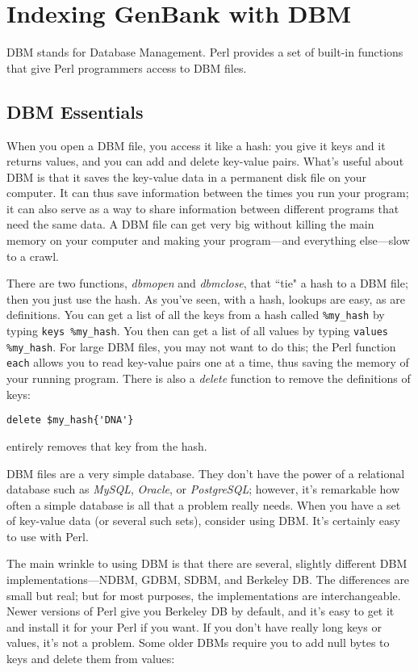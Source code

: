 \section{Indexing GenBank with DBM}
DBM stands for Database Management. Perl provides a set of built-in functions that give Perl programmers access to DBM files.

\subsection{DBM Essentials}
When you open a DBM file, you access it like a hash: you give it keys and it returns values, and you can add and delete key-value pairs. What's useful about DBM is that it saves the key-value data in a permanent disk file on your computer. It can thus save information between the times you run your program; it can also serve as a way to share information between different programs that need the same data. A DBM file can get very big without killing the main memory on your computer and making your program—and everything else—slow to a crawl.

There are two functions, \textit{dbmopen} and \textit{dbmclose}, that ``tie" a hash to a DBM file; then you just use the hash. As you've seen, with a hash, lookups are easy, as are definitions. You can get a list of all the keys from a hash called \verb|%my_hash| by typing \verb|keys %my_hash|. You then can get a list of all values by typing \verb|values %my_hash|. For large DBM files, you may not want to do this; the Perl function \verb|each| allows you to read key-value pairs one at a time, thus saving the memory of your running program. There is also a \textit{delete} function to remove the definitions of keys:

\begin{lstlisting}
delete $my_hash{'DNA'}
\end{lstlisting}

entirely removes that key from the hash.

DBM files are a very simple database. They don't have the power of a relational database such as \textit{MySQL}, \textit{Oracle}, or \textit{PostgreSQL}; however, it's remarkable how often a simple database is all that a problem really needs. When you have a set of key-value data (or several such sets), consider using DBM. It's certainly easy to use with Perl.

The main wrinkle to using DBM is that there are several, slightly different DBM implementations—NDBM, GDBM, SDBM, and Berkeley DB. The differences are small but real; but for most purposes, the implementations are interchangeable. Newer versions of Perl give you Berkeley DB by default, and it's easy to get it and install it for your Perl if you want. If you don't have really long keys or values, it's not a problem. Some older DBMs require you to add null bytes to keys and delete them from values:

